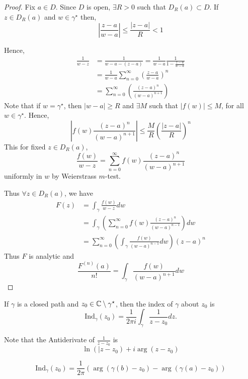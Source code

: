 \documentclass[12pt]{article}
\begin{document}
\begin{proof}
    Fix $a \in D$. Since $D$ is open, $\exists R > 0$ such that $D_R(a) \subset D$. If $z \in D_R(a)$ and $w \in \gamma^\star$ then, 
    \[\left|\frac{z-a}{w-a}\right| \leq \frac{|z -a|}{R}  < 1\]

    Hence, 
    \begin{align*}
        \frac{1}{w-z} &= \frac{1}{w-a-(z-a)} = \frac{1}{w-a} \frac{1}{1 - \frac{z-a}{w-a}} \\ 
        &= \frac{1}{w-a} \sum_{n=0}^\infty \left( \frac{z-a}{w-a}\right)^n \\ 
        &= \sum_{n=0}^\infty \left( \frac{(z-a)^n}{(w-a)^{n+1}}\right)  
    \end{align*}
    Note that if $w = \gamma^\star$, then $| w- a| \geq R$ and $\exists M$ such that $|f(w)| \leq M$, for all $w \in \gamma^\star$. Hence, 
    \[\left| f(w)\frac{(z-a)^n}{(w-a)^{n+1}}\right| \leq \frac{M}{R} \left(\frac{|z-a|}{R}\right)^n\]
    This for fixed $z \in D_R(a)$, 
    \[\frac{f(w)}{w-z} = \sum_{n=0}^\infty f(w) \frac{(z-a)^n}{(w-a)^{n+1}}\]
    uniformly in $w$ by Weierstrass $m$-test. 
    
    Thus $\forall z \in D_R(a)$, we have 
    \begin{align*}
        F(z) &= \int_\gamma\frac{f(w)}{w-z} dw \\ 
        &= \int_\gamma \left( \sum_{n=0}^\infty f(w) \frac{(z-a)^n}{(w-a)^{n-1}}\right) dw \\
        &= \sum_{n=0}^\infty \left( \int_\gamma\frac{f(w)}{(w-a)^{n-1}} dw\right) (z-a)^n 
    \end{align*}
    Thus $F$ is analytic and 
    \[\frac{F^{(n)}(a)}{n!} = \int_\gamma \frac{f(w)}{(w-a)^{n+1}} dw\]
\end{proof}

\begin{definition}
    If $\gamma$ is a closed path and $z_0 \in \mathbb C \setminus \gamma^\star$, then the index of $\gamma$ about $z_0$ is 
    \[\text{Ind}_\gamma (z_0) = \frac{1}{2 \pi i } \int_\gamma\frac{1}{z-z_0} dz.\]

    Note that the Antiderivate of $\frac{1}{z - z_0}$ is 
    \[\ln(|z-z_0) + i\arg(z-z_0)\]

    \[\text{Ind}_\gamma (z_0) = \frac{1}{2\pi} \left(\arg(\gamma(b) - z_0) - \arg(\gamma(a) - z_0)\right)\]
\end{definition}
\end{document}

